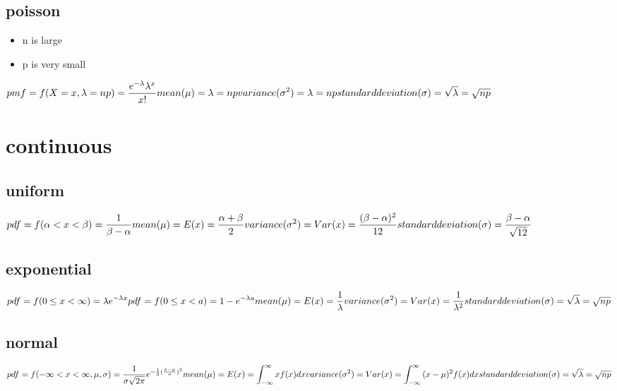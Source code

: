 \documentclass[12pt]{article}
\begin{document}
\subsection{poisson}
\begin{itemize}
  \item n is large
  \item p is very small
\end{itemize}
$
pmf = f(X=x, \lambda = np) = \displaystyle\frac{e^{-\lambda}\lambda^x}{x!} \\ \\
mean (\mu) = \lambda = np \\
variance (\sigma^2) = \lambda = np \\
standard deviation (\sigma) = \sqrt\lambda = \sqrt{np}
$
\newpage

\section{continuous}
\subsection{uniform}
$\displaystyle
pdf = f(\alpha < x < \beta) = \frac{1}{\beta - \alpha} \\ \\
mean (\mu) = E(x) = \frac{\alpha + \beta}{2} \\
variance (\sigma^2) = Var(x) = \frac{(\beta - \alpha)^2}{12} \\
standard deviation (\sigma) =\frac{\beta - \alpha}{\sqrt{12}}
$

\subsection{exponential}
$\displaystyle
pdf = f(0 \leq x < \infty) = \lambda e^{-\lambda x} \\
pdf = f(0 \leq x < a) = 1 - e^{-\lambda a} \\ \\
mean (\mu) = E(x) = \frac{1}{\lambda} \\
variance (\sigma^2) = Var(x) = \frac{1}{\lambda^2} \\
standard deviation (\sigma) = \sqrt\lambda = \sqrt{np}
$

\subsection{normal}
$\displaystyle
pdf = f(-\infty < x < \infty, \mu, \sigma) = \frac{1}{\sigma\sqrt{2\pi}} e^{-\frac{1}{2}(\frac{x-\mu}{\sigma})^2} \\ \\
mean (\mu) = E(x) = \int_{-\infty}^{\infty}{xf(x)dx} \\
variance (\sigma^2) = Var(x) = \int_{-\infty}^{\infty}{(x-\mu)^2f(x)dx} \\
standard deviation (\sigma) = \sqrt\lambda = \sqrt{np}
$
\end{document}
